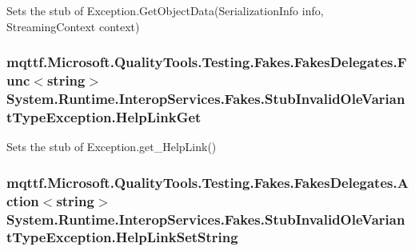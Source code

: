 Sets the stub of Exception.\-Get\-Object\-Data(\-Serialization\-Info info, Streaming\-Context context)

\hypertarget{class_system_1_1_runtime_1_1_interop_services_1_1_fakes_1_1_stub_invalid_ole_variant_type_exception_ab4e3516129b7a5ced030e36c6d4d4ae0}{
\subsubsection[{Help\-Link\-Get}]{\setlength{\rightskip}{0pt plus 5cm}mqttf.\-Microsoft.\-Quality\-Tools.\-Testing.\-Fakes.\-Fakes\-Delegates.\-Func$<$string$>$ System.\-Runtime.\-Interop\-Services.\-Fakes.\-Stub\-Invalid\-Ole\-Variant\-Type\-Exception.\-Help\-Link\-Get}}\label{class_system_1_1_runtime_1_1_interop_services_1_1_fakes_1_1_stub_invalid_ole_variant_type_exception_ab4e3516129b7a5ced030e36c6d4d4ae0}


Sets the stub of Exception.\-get\-\_\-\-Help\-Link()

\hypertarget{class_system_1_1_runtime_1_1_interop_services_1_1_fakes_1_1_stub_invalid_ole_variant_type_exception_a442af8c6ee0c76910cadefcd6a563ec4}{
\subsubsection[{Help\-Link\-Set\-String}]{\setlength{\rightskip}{0pt plus 5cm}mqttf.\-Microsoft.\-Quality\-Tools.\-Testing.\-Fakes.\-Fakes\-Delegates.\-Action$<$string$>$ System.\-Runtime.\-Interop\-Services.\-Fakes.\-Stub\-Invalid\-Ole\-Variant\-Type\-Exception.\-Help\-Link\-Set\-String}}\label{class_system_1_1_runtime_1_1_interop_services_1_1_fakes_1_1_stub_invalid_ole_variant_type_exception_a442af8c6ee0c76910cadefcd6a563ec4}


